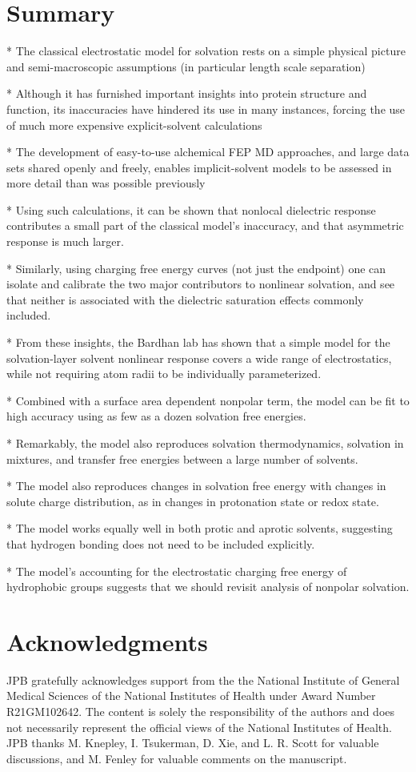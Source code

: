 \documentclass[reprint, letterpaper, nobibnotes, aps, superscriptaddress,prb]{revtex4-1}
\begin{document}
\section{Summary}

* The classical electrostatic model for solvation rests on a simple physical picture and semi-macroscopic assumptions (in particular length scale separation)

* Although it has furnished important insights into protein structure and function, its inaccuracies have hindered its use in many instances, forcing the use of much more expensive explicit-solvent calculations

* The development of easy-to-use alchemical FEP MD approaches, and large data sets shared openly and freely, enables implicit-solvent models to be assessed in more detail than was possible previously

* Using such calculations, it can be shown that nonlocal dielectric response contributes a small part of the classical model's inaccuracy, and that asymmetric response is much larger.

* Similarly, using charging free energy curves (not just the endpoint) one can isolate and calibrate the two major contributors to nonlinear solvation, and see that neither is associated with the dielectric saturation effects commonly included.

* From these insights, the Bardhan lab has shown that a simple model for the solvation-layer solvent nonlinear response covers a wide range of electrostatics, while not requiring atom radii to be individually parameterized.

* Combined with a surface area dependent nonpolar term, the model can be fit to high accuracy using as few as a dozen solvation free energies.  

* Remarkably, the model also reproduces solvation thermodynamics, solvation in mixtures, and transfer free energies between a large number of solvents.

* The model also reproduces changes in solvation free energy with changes in solute charge distribution, as in changes in protonation state or redox state.

* The model works equally well in both protic and aprotic solvents, suggesting that hydrogen bonding does not need to be included explicitly.

* The model's accounting for the electrostatic charging free energy of hydrophobic groups suggests that we should revisit analysis of nonpolar solvation.

\section*{Acknowledgments}
JPB gratefully acknowledges support from the  the National Institute of General Medical Sciences of the National Institutes of Health under Award Number R21GM102642.  The content is solely the responsibility of the authors and does not necessarily represent the official views of the National Institutes of Health.  JPB thanks M. Knepley, I. Tsukerman, D. Xie, and L. R. Scott for valuable discussions, and M. Fenley for valuable comments on the manuscript.



\end{document}
